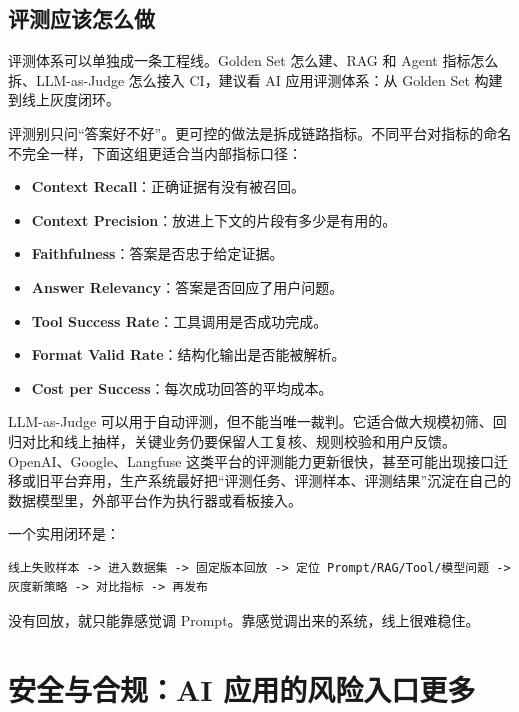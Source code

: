 \documentclass[9pt,a4paper,twocolumn]{ctexart}
\begin{document}
\subsection*{评测应该怎么做}


评测体系可以单独成一条工程线。Golden Set 怎么建、RAG 和 Agent 指标怎么拆、LLM-as-Judge 怎么接入 CI，建议看 AI 应用评测体系：从 Golden Set 构建到线上灰度闭环。



评测别只问“答案好不好”。更可控的做法是拆成链路指标。不同平台对指标的命名不完全一样，下面这组更适合当内部指标口径：


\begin{itemize}[itemsep=1pt, topsep=2pt]
  \item \textbf{Context Recall}：正确证据有没有被召回。
  \item \textbf{Context Precision}：放进上下文的片段有多少是有用的。
  \item \textbf{Faithfulness}：答案是否忠于给定证据。
  \item \textbf{Answer Relevancy}：答案是否回应了用户问题。
  \item \textbf{Tool Success Rate}：工具调用是否成功完成。
  \item \textbf{Format Valid Rate}：结构化输出是否能被解析。
  \item \textbf{Cost per Success}：每次成功回答的平均成本。
\end{itemize}


LLM-as-Judge 可以用于自动评测，但不能当唯一裁判。它适合做大规模初筛、回归对比和线上抽样，关键业务仍要保留人工复核、规则校验和用户反馈。OpenAI、Google、Langfuse 这类平台的评测能力更新很快，甚至可能出现接口迁移或旧平台弃用，生产系统最好把“评测任务、评测样本、评测结果”沉淀在自己的数据模型里，外部平台作为执行器或看板接入。



一个实用闭环是：



\begin{lstlisting}
线上失败样本 -> 进入数据集 -> 固定版本回放 -> 定位 Prompt/RAG/Tool/模型问题 -> 灰度新策略 -> 对比指标 -> 再发布
\end{lstlisting}



没有回放，就只能靠感觉调 Prompt。靠感觉调出来的系统，线上很难稳住。



\section*{安全与合规：AI 应用的风险入口更多}
\end{document}
